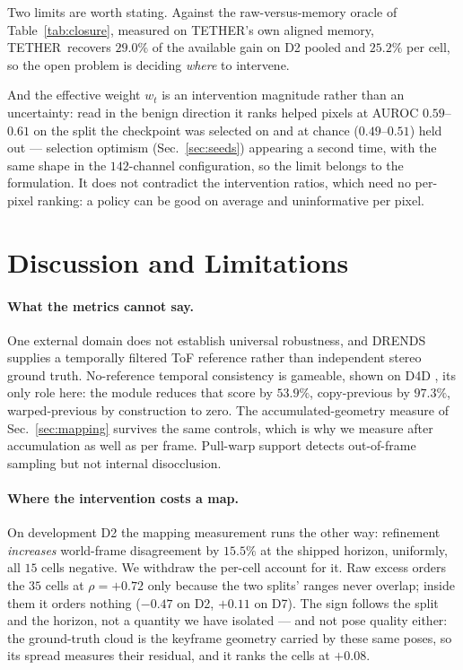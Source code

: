 \documentclass[letterpaper,10pt,conference]{ieeeconf}
\newcommand{\steer}{TETHER}
\begin{document}
Two limits are worth stating. Against the raw-versus-memory oracle of
Table~\ref{tab:closure}, measured on \steer's own aligned memory, \steer\
recovers $29.0\%$ of the available gain on D2 pooled and $25.2\%$ per cell, so
the open problem is deciding \emph{where} to intervene.

And the effective weight $w_t$ is an intervention magnitude rather than an
uncertainty: read in the benign direction it ranks helped pixels at AUROC
$0.59$--$0.61$ on the split the checkpoint was selected on and at chance
($0.49$--$0.51$) held out --- selection optimism (Sec.~\ref{sec:seeds})
appearing a second time, with the same shape in the $142$-channel
configuration, so the limit belongs to the formulation. It does not
contradict the intervention ratios, which need no per-pixel ranking: a
policy can be good on average and uninformative per pixel.

\section{Discussion and Limitations}
\label{sec:limits}

\paragraph{What the metrics cannot say.}
One external domain does not establish universal robustness, and DRENDS
supplies a temporally filtered ToF reference rather than independent stereo
ground truth. No-reference temporal consistency is gameable, shown on D4D
\cite{docea2026d4d}, its only role here: the module reduces that score by
$53.9\%$, copy-previous by $97.3\%$, warped-previous by construction to zero.
The accumulated-geometry measure of Sec.~\ref{sec:mapping} survives the same
controls, which is why we measure after accumulation as well as per frame. Pull-warp support
detects out-of-frame sampling but not internal disocclusion.

\paragraph{Where the intervention costs a map.}
On development D2 the mapping measurement runs the other way: refinement
\emph{increases} world-frame disagreement by $15.5\%$ at the shipped horizon,
uniformly, all $15$ cells negative. We withdraw the per-cell account for it.
Raw excess orders the $35$ cells at $\rho{=}{+}0.72$ only because the two
splits' ranges never overlap; inside them it orders nothing ($-0.47$ on D2,
$+0.11$ on D7). The sign follows the split and the horizon, not a quantity we
have isolated --- and not pose quality either: the ground-truth cloud is the
keyframe geometry carried by these same poses, so its spread measures their
residual, and it ranks the cells at $+0.08$.
\end{document}
